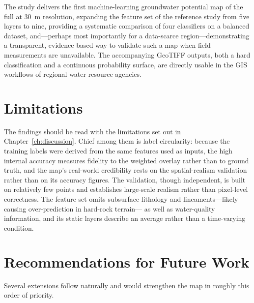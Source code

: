 The study delivers the first machine-learning groundwater potential map of the
full \studyarea{} at 30~m resolution, expanding the feature set of the reference
study from five layers to nine, providing a systematic comparison of four
classifiers on a balanced dataset, and---perhaps most importantly for a
data-scarce region---demonstrating a transparent, evidence-based way to validate
such a map when field measurements are unavailable. The accompanying GeoTIFF
outputs, both a hard classification and a continuous probability surface, are
directly usable in the GIS workflows of regional water-resource agencies.

\section{Limitations}
\label{sec:concl_limitations}

The findings should be read with the limitations set out in
Chapter~\ref{ch:discussion}. Chief among them is label circularity: because the
training labels were derived from the same features used as inputs, the high
internal accuracy measures fidelity to the weighted overlay rather than to ground
truth, and the map's real-world credibility rests on the spatial-realism
validation rather than on its accuracy figures. The validation, though
independent, is built on relatively few points and establishes large-scale
realism rather than pixel-level correctness. The feature set omits subsurface
lithology and lineaments---likely causing over-prediction in hard-rock terrain---
as well as water-quality information, and its static layers describe an average
rather than a time-varying condition.

\section{Recommendations for Future Work}
\label{sec:concl_future}

Several extensions follow naturally and would strengthen the map in roughly this
order of priority.

